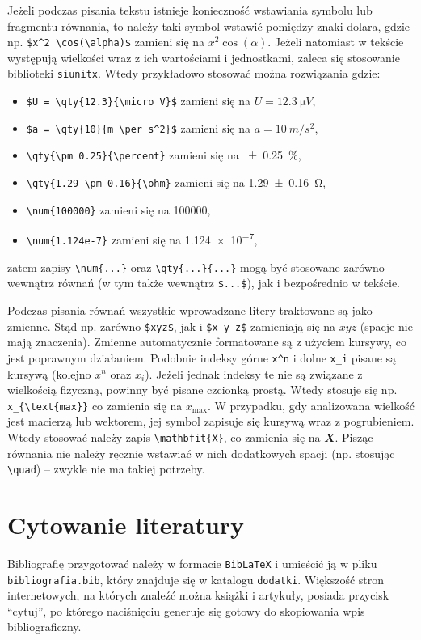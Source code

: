 Jeżeli podczas pisania tekstu istnieje konieczność wstawiania symbolu lub fragmentu równania, to należy taki symbol wstawić pomiędzy znaki dolara, gdzie np. \verb|$x^2 \cos(\alpha)$| zamieni się na $x^2 \cos(\alpha)$. Jeżeli natomiast w tekście występują wielkości wraz z ich wartościami i jednostkami, zaleca się stosowanie biblioteki \texttt{siunitx}. Wtedy przykładowo stosować można rozwiązania gdzie:
\begin{itemize}
\item \verb|$U = \qty{12.3}{\micro V}$| zamieni się na $U = \qty{12.3}{\micro V}$,
\item \verb|$a = \qty{10}{m \per s^2}$| zamieni się na $a = \qty{10}{m \per s^2}$,
\item \verb|\qty{\pm 0.25}{\percent}| zamieni się na \qty{\pm 0.25}{\percent},
\item \verb|\qty{1.29 \pm 0.16}{\ohm}| zamieni się na \qty{1.29 \pm 0.16}{\ohm},
\item \verb|\num{100000}| zamieni się na \num{100000},
\item \verb|\num{1.124e-7}| zamieni się na \num{1.124e-7},
\end{itemize}
zatem zapisy \verb|\num{...}| oraz \verb|\qty{...}{...}| mogą być stosowane zarówno wewnątrz równań (w tym także wewnątrz \verb|$...$|), jak i bezpośrednio w tekście.

Podczas pisania równań wszystkie wprowadzane litery traktowane są jako zmienne. Stąd np. zarówno \verb|$xyz$|, jak i \verb|$x y z$| zamieniają się na $xyz$ (spacje nie mają znaczenia). Zmienne automatycznie formatowane są z użyciem kursywy, co jest poprawnym działaniem. Podobnie indeksy górne \verb|x^n| i dolne \verb|x_i| pisane są kursywą (kolejno $x^n$ oraz $x_i$). Jeżeli jednak indeksy te nie są związane z wielkością fizyczną, powinny być pisane czcionką prostą. Wtedy stosuje się np. \verb|x_{\text{max}}| co zamienia się na $x_{\text{max}}$. W przypadku, gdy analizowana wielkość jest macierzą lub wektorem, jej symbol zapisuje się kursywą wraz z pogrubieniem. Wtedy stosować należy zapis \verb|\mathbfit{X}|, co zamienia się na $\mathbfit{X}$. Pisząc równania nie należy ręcznie wstawiać w nich dodatkowych spacji (np. stosując \verb|\quad|) -- zwykle nie ma takiej potrzeby.

\section{Cytowanie literatury}

Bibliografię przygotować należy w formacie \texttt{BibLaTeX} i umieścić ją w pliku \texttt{bibliografia.bib}, który znajduje się w katalogu \texttt{dodatki}. Większość stron internetowych, na których znaleźć można książki i artykuły, posiada przycisk \enquote{cytuj}, po którego naciśnięciu generuje się gotowy do skopiowania wpis bibliograficzny.

